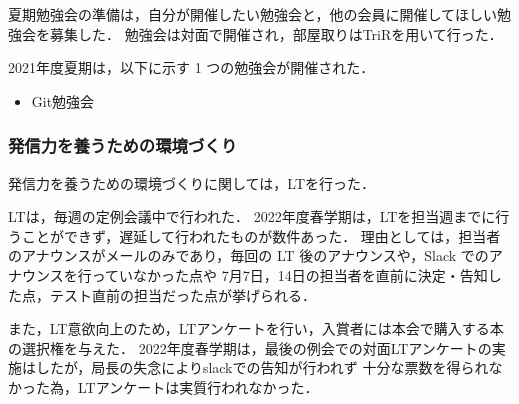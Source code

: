 夏期勉強会の準備は，自分が開催したい勉強会と，他の会員に開催してほしい勉強会を募集した．
勉強会は対面で開催され，部屋取りはTriRを用いて行った．

2021年度夏期は，以下に示す 1 つの勉強会が開催された．

\begin{itemize}
    \item Git勉強会
\end{itemize}


\subsubsection*{発信力を養うための環境づくり}
発信力を養うための環境づくりに関しては，LTを行った．

LTは，毎週の定例会議中で行われた．
2022年度春学期は，LTを担当週までに行うことができず，遅延して行われたものが数件あった．
理由としては，担当者のアナウンスがメールのみであり，毎回の LT 後のアナウンスや，Slack でのアナウンスを行っていなかった点や
7月7日，14日の担当者を直前に決定・告知した点，テスト直前の担当だった点が挙げられる．

また，LT意欲向上のため，LTアンケートを行い，入賞者には本会で購入する本の選択権を与えた．
2022年度春学期は，最後の例会での対面LTアンケートの実施はしたが，局長の失念によりslackでの告知が行われず
十分な票数を得られなかった為，LTアンケートは実質行われなかった．